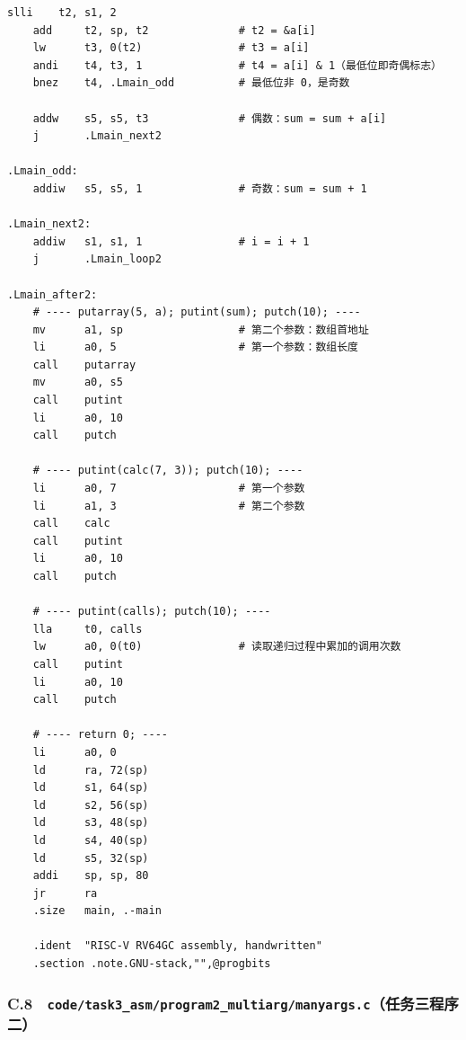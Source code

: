 \documentclass[UTF8,a4paper,10pt]{ctexart}
\begin{document}
\begin{lstlisting}[language=riscv]
    slli    t2, s1, 2
    add     t2, sp, t2              # t2 = &a[i]
    lw      t3, 0(t2)               # t3 = a[i]
    andi    t4, t3, 1               # t4 = a[i] & 1（最低位即奇偶标志）
    bnez    t4, .Lmain_odd          # 最低位非 0，是奇数

    addw    s5, s5, t3              # 偶数：sum = sum + a[i]
    j       .Lmain_next2

.Lmain_odd:
    addiw   s5, s5, 1               # 奇数：sum = sum + 1

.Lmain_next2:
    addiw   s1, s1, 1               # i = i + 1
    j       .Lmain_loop2

.Lmain_after2:
    # ---- putarray(5, a); putint(sum); putch(10); ----
    mv      a1, sp                  # 第二个参数：数组首地址
    li      a0, 5                   # 第一个参数：数组长度
    call    putarray
    mv      a0, s5
    call    putint
    li      a0, 10
    call    putch

    # ---- putint(calc(7, 3)); putch(10); ----
    li      a0, 7                   # 第一个参数
    li      a1, 3                   # 第二个参数
    call    calc
    call    putint
    li      a0, 10
    call    putch

    # ---- putint(calls); putch(10); ----
    lla     t0, calls
    lw      a0, 0(t0)               # 读取递归过程中累加的调用次数
    call    putint
    li      a0, 10
    call    putch

    # ---- return 0; ----
    li      a0, 0
    ld      ra, 72(sp)
    ld      s1, 64(sp)
    ld      s2, 56(sp)
    ld      s3, 48(sp)
    ld      s4, 40(sp)
    ld      s5, 32(sp)
    addi    sp, sp, 80
    jr      ra
    .size   main, .-main

    .ident  "RISC-V RV64GC assembly, handwritten"
    .section .note.GNU-stack,"",@progbits\end{lstlisting}


\subsubsection{C.8　\texttt{code/task3\_asm/program2\_multiarg/manyargs.c}（任务三程序二）}
\end{document}
